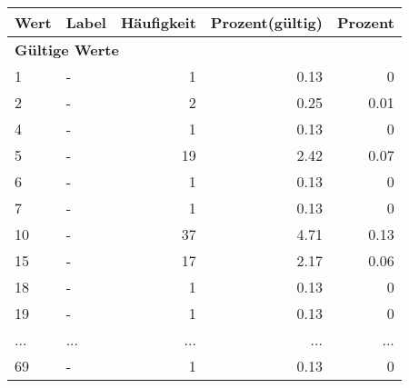      \begin{longtable}{lXrrr}
     \toprule
     \textbf{Wert} & \textbf{Label} & \textbf{Häufigkeit} & \textbf{Prozent(gültig)} & \textbf{Prozent} \\
     \endhead
     \midrule
     \multicolumn{5}{l}{\textbf{Gültige Werte}}\\
        1 & \multicolumn{1}{X}{-} & %
          \num{1} &
          \num[round-mode=places,round-precision=2]{0,13} &
          \num[round-mode=places,round-precision=2]{0} \\
        2 & \multicolumn{1}{X}{-} & %
          \num{2} &
          \num[round-mode=places,round-precision=2]{0,25} &
          \num[round-mode=places,round-precision=2]{0,01} \\
        4 & \multicolumn{1}{X}{-} & %
          \num{1} &
          \num[round-mode=places,round-precision=2]{0,13} &
          \num[round-mode=places,round-precision=2]{0} \\
        5 & \multicolumn{1}{X}{-} & %
          \num{19} &
          \num[round-mode=places,round-precision=2]{2,42} &
          \num[round-mode=places,round-precision=2]{0,07} \\
        6 & \multicolumn{1}{X}{-} & %
          \num{1} &
          \num[round-mode=places,round-precision=2]{0,13} &
          \num[round-mode=places,round-precision=2]{0} \\
        7 & \multicolumn{1}{X}{-} & %
          \num{1} &
          \num[round-mode=places,round-precision=2]{0,13} &
          \num[round-mode=places,round-precision=2]{0} \\
        10 & \multicolumn{1}{X}{-} & %
          \num{37} &
          \num[round-mode=places,round-precision=2]{4,71} &
          \num[round-mode=places,round-precision=2]{0,13} \\
        15 & \multicolumn{1}{X}{-} & %
          \num{17} &
          \num[round-mode=places,round-precision=2]{2,17} &
          \num[round-mode=places,round-precision=2]{0,06} \\
        18 & \multicolumn{1}{X}{-} & %
          \num{1} &
          \num[round-mode=places,round-precision=2]{0,13} &
          \num[round-mode=places,round-precision=2]{0} \\
        19 & \multicolumn{1}{X}{-} & %
          \num{1} &
          \num[round-mode=places,round-precision=2]{0,13} &
          \num[round-mode=places,round-precision=2]{0} \\
       ... & ... & ... & ... & ... \\
        69 & \multicolumn{1}{X}{-} & %
          \num{1} &
          \num[round-mode=places,round-precision=2]{0,13} &
          \num[round-mode=places,round-precision=2]{0} \\


\end{longtable}
